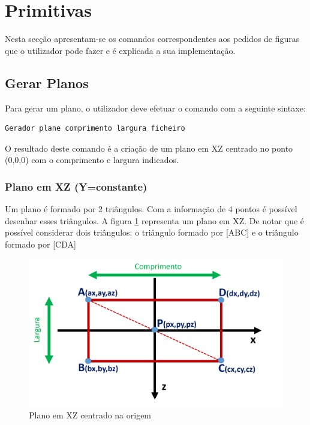 \newpage
\section{Primitivas}

Nesta secção apresentam-se os comandos correspondentes aos pedidos de figuras que o utilizador pode fazer e é explicada a sua implementação.

\subsection{Gerar Planos}
\label{p3:planos}

Para gerar um plano, o utilizador deve efetuar o comando com a seguinte sintaxe:

\begin{Verbatim}
Gerador plane comprimento largura ficheiro
\end{Verbatim}

O resultado deste comando é a criação de um plano em XZ centrado no ponto (0,0,0) com o comprimento e largura indicados.

\subsubsection{Plano em XZ (Y=constante)}

Um plano é formado por 2 triângulos. Com a informação de 4 pontos é possível desenhar esses triângulos. A figura \ref{p1:fig:p3_planoY} representa um plano em XZ. De notar que é possível considerar dois triângulos: o triângulo formado por [ABC] e o triângulo formado por [CDA]

\begin{figure}[<+htpb+>]
	\centering
	\includegraphics[scale=0.5]{imagens/p3_planoY.png}
	\caption{Plano em XZ centrado na origem}
	\label{p1:fig:p3_planoY}
\end{figure}

